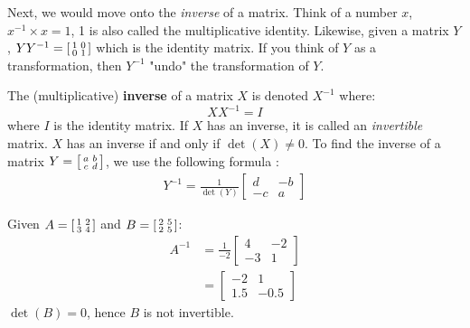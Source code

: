 Next, we would move onto the \emph{inverse} of a matrix. Think of a number \(x\), \(x^{-1}\times x=1\), 1 is also called the multiplicative identity. Likewise, given a matrix \(Y\), \(YY^{-1}=\begin{bsmallmatrix}
  1 & 0 \\
  0 & 1
\end{bsmallmatrix} \) which is the identity matrix. If you think of \(Y\) as a transformation, then \(Y^{-1}\) "undo" the transformation of \(Y\). 
\begin{definition}
  The (multiplicative) \textbf{inverse} of a matrix \(X\) is denoted \(X^{-1}\) where:
  \begin{equation*}
    X X^{-1} = I
  \end{equation*}
  where \(I\) is the identity matrix. If \(X\) has an inverse, it is called an \emph{invertible} matrix. \(X\) has an inverse if and only if \(\det(X)\neq 0\). To find the inverse of a matrix \(Y=\begin{bsmallmatrix}
    a & b \\
    c & d
  \end{bsmallmatrix} \), we use the following formula \footnotemark:
  \begin{align}
    Y^{-1} = \frac{1}{\det(Y)}\begin{bmatrix}
      d & -b \\
      -c & a
    \end{bmatrix}
    \label{formulamatrixinv}
  \end{align}
\end{definition}
\begin{example}
  Given \(A=\begin{bsmallmatrix}
    1 & 2 \\
    3 & 4
  \end{bsmallmatrix} \) and \(B=\begin{bsmallmatrix}
    2 & 5 \\
    2 & 5
  \end{bsmallmatrix} \):
  \begin{align*}
    A^{-1} &= \frac{1}{-2}\begin{bmatrix}
      4 & -2 \\
      -3 & 1 
    \end{bmatrix} \\
    &= \begin{bmatrix}
      -2 & 1 \\
      1.5 & -0.5
    \end{bmatrix}
  \end{align*}
  \(\det(B)=0\), hence \(B\) is not invertible.
\end{example}



